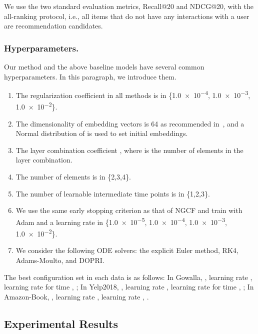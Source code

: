 \documentclass[sigconf]{acmart}
\begin{document}
We use the two standard evaluation metrics, Recall@20 and NDCG@20, with the all-ranking protocol, i.e., all items that do not have any interactions with a user are recommendation candidates.

\subsubsection{Hyperparameters.} Our method and the above baseline models have several common hyperparameters. In this paragraph, we introduce them.
\begin{enumerate}
\item The regularization coefficient  in all methods is in \{\num{1.0e-4}, \num{1.0e-3}, \num{1.0e-2}\}.
\item The dimensionality of embedding vectors is 64 as recommended in~\cite{10.1145/3397271.3401063}, and a Normal distribution of  is used to set initial embeddings.
\item The layer combination coefficient , where  is the number of elements in the layer combination.
\item The number of elements  is in \{2,3,4\}.
\item The number of learnable intermediate time points  is in \{1,2,3\}.
\item We use the same early stopping criterion as that of NGCF and train with Adam and a learning rate in \{\num{1.0e-5}, \num{1.0e-4}, \num{1.0e-3}, \num{1.0e-2}\}.
\item We consider the following ODE solvers: the explicit Euler method, RK4, Adams-Moulto, and DOPRI.
\end{enumerate}

The best configuration set in each data is as follows: In Gowalla, , learning rate , learning rate for time , ; In Yelp2018, , learning rate , learning rate for time ,  ; In Amazon-Book, , learning rate , learning rate , .






\subsection{Experimental Results}
\end{document}
